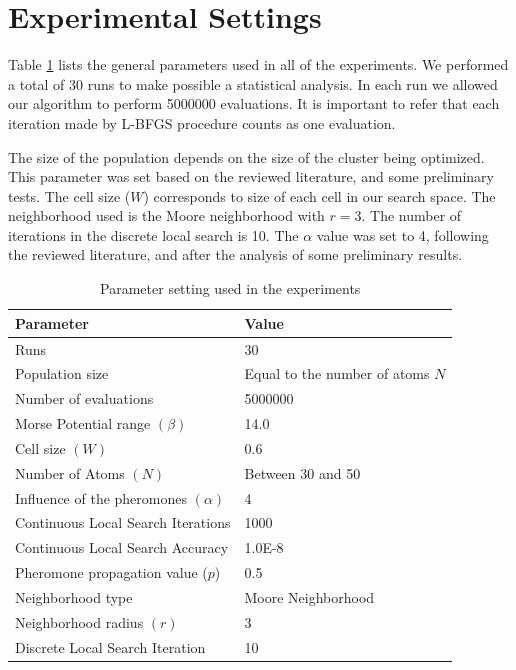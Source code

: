 \section*{Experimental Settings} \label{sec:experimental_setting}
Table \ref{tab:general_settings} lists the general parameters used in all of the experiments. We performed a total of 30 runs to make possible a statistical analysis. In each run we allowed our algorithm to perform 5000000 evaluations. It is important to refer that each iteration made by L-BFGS procedure counts as one evaluation. 

The size of the population depends on the size of the cluster being optimized. This parameter was set based on the reviewed literature, and some preliminary tests. The cell size ($W$) corresponds to size of each cell in our search space. The neighborhood used is the Moore neighborhood with $r = 3$. The number of iterations in the discrete local search is 10. The $\alpha$ value was set to 4, following the reviewed literature, and after the analysis of some preliminary results.
\begin{table}[!htdp]
	\begin{center}
		\begin{tabular}{| l | p{8cm} |}
			\hline
			\textbf{Parameter} & \textbf{Value} \\ \hline
			Runs & 30 \\
			Population size & Equal to the number of atoms $N$\\
			Number of evaluations & 5000000 \\
			Morse Potential range $(\beta)$ & 14.0 \\ 
			Cell size $(W)$ & 0.6 \\
			Number of Atoms $(N)$ & Between 30 and 50 \\
			Influence of the pheromones $(\alpha)$ & 4 \\
			Continuous Local Search Iterations & 1000\\
			Continuous Local Search Accuracy & 1.0E-8\\
			Pheromone propagation value ($p$) & 0.5 \\
			Neighborhood type & Moore Neighborhood \\
			Neighborhood radius $(r)$ & 3 \\
			Discrete Local Search Iteration & 10 \\
			\hline
		\end{tabular}
	\caption{Parameter setting used in the experiments}
	\label{tab:general_settings}
	\end{center}
\end{table}
